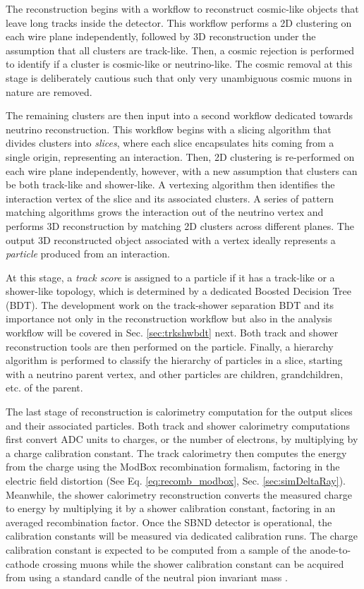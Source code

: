 The reconstruction begins with a workflow to reconstruct cosmic-like objects that leave long tracks inside the detector.
This workflow performs a 2D clustering on each wire plane independently, followed by 3D reconstruction under the assumption that all clusters are track-like.
Then, a cosmic rejection is performed to identify if a cluster is cosmic-like or neutrino-like.
The cosmic removal at this stage is deliberately cautious such that only very unambiguous cosmic muons in nature are removed.

The remaining clusters are then input into a second workflow dedicated towards neutrino reconstruction.
This workflow begins with a slicing algorithm that divides clusters into \textit{slices}, where each slice encapsulates hits coming from a single origin, representing an interaction.
Then, 2D clustering is re-performed on each wire plane independently, however, with a new assumption that clusters can be both track-like and shower-like.
A vertexing algorithm then identifies the interaction vertex of the slice and its associated clusters.
A series of pattern matching algorithms grows the interaction out of the neutrino vertex and performs 3D reconstruction by matching 2D clusters across different planes.
The output 3D reconstructed object associated with a vertex ideally represents a \textit{particle} produced from an interaction.

At this stage, a \textit{track score} is assigned to a particle if it has a track-like or a shower-like topology, which is determined by a dedicated Boosted Decision Tree (BDT).
The development work on the track-shower separation BDT and its importance not only in the reconstruction workflow but also in the analysis workflow will be covered in Sec. \ref{sec:trkshwbdt} next.
Both track and shower reconstruction tools are then performed on the particle. 
Finally, a hierarchy algorithm is performed to classify the hierarchy of particles in a slice, starting with a neutrino parent vertex, and other particles are children, grandchildren, etc. of the parent.                             

The last stage of reconstruction is calorimetry computation for the output slices and their associated particles.
Both track and shower calorimetry computations first convert ADC units to charges, or the number of electrons, by multiplying by a charge calibration constant.
The track calorimetry then computes the energy from the charge using the ModBox recombination formalism, factoring in the electric field distortion (See Eq. \ref{eq:recomb_modbox}, Sec. \ref{sec:simDeltaRay}).
Meanwhile, the shower calorimetry reconstruction converts the measured charge to energy by multiplying it by a shower calibration constant, factoring in an averaged recombination factor. 
Once the SBND detector is operational, the calibration constants will be measured via dedicated calibration runs.
The charge calibration constant is expected to be computed from a sample of the anode-to-cathode crossing muons while the shower calibration constant can be acquired from using a standard candle of the neutral pion invariant mass \cite{uboone_gamma}.

